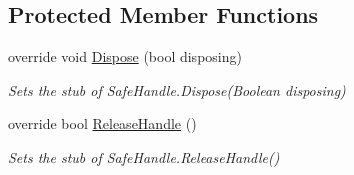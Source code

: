 \subsection*{Protected Member Functions}
\begin{DoxyCompactItemize}
\item 
override void \hyperlink{class_system_1_1_security_1_1_authentication_1_1_extended_protection_1_1_fakes_1_1_stub_channel_binding_a7b2de83fe9621a43e4d358a24309c87a}{Dispose} (bool disposing)
\begin{DoxyCompactList}\small\item\em Sets the stub of Safe\-Handle.\-Dispose(\-Boolean disposing)\end{DoxyCompactList}\item 
override bool \hyperlink{class_system_1_1_security_1_1_authentication_1_1_extended_protection_1_1_fakes_1_1_stub_channel_binding_a7d6264d7151cf27bb02cc0fd8e1ca142}{Release\-Handle} ()
\begin{DoxyCompactList}\small\item\em Sets the stub of Safe\-Handle.\-Release\-Handle()\end{DoxyCompactList}\end{DoxyCompactItemize}
